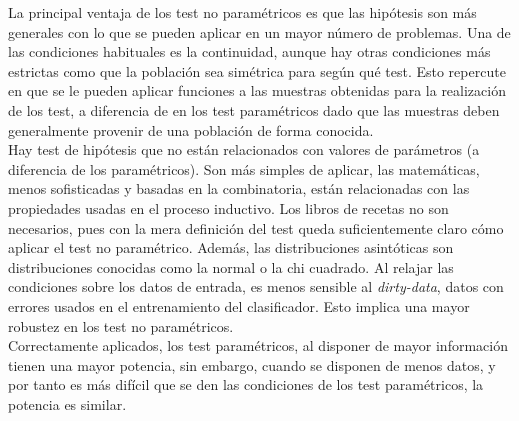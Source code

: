  
 	La principal ventaja de los test no paramétricos es que las hipótesis son más generales con lo que se pueden aplicar en un mayor número de problemas. Una de las condiciones habituales es la continuidad, aunque hay otras condiciones más estrictas como que la población sea simétrica para según qué test. Esto repercute en que se le pueden aplicar funciones a las muestras obtenidas para la realización de los test, a diferencia de en los test paramétricos dado que las muestras deben generalmente provenir de una población de forma conocida.\\
 	
 	Hay test de hipótesis que no están relacionados con valores de parámetros (a diferencia de los paramétricos). Son más simples de aplicar, las matemáticas, menos sofisticadas y basadas en la combinatoria, están relacionadas con las propiedades usadas en el proceso inductivo. Los libros de recetas no son necesarios, pues con la mera definición del test queda suficientemente claro cómo aplicar el test no paramétrico. Además, las distribuciones asintóticas son distribuciones conocidas como la normal o la chi cuadrado. Al relajar las condiciones sobre los datos de entrada, es menos sensible al \textit{dirty-data}, datos con errores usados en el entrenamiento del clasificador. Esto implica una mayor robustez en los test no paramétricos.\\
 	
 	Correctamente aplicados, los test paramétricos, al disponer de mayor información tienen una mayor potencia, sin embargo, cuando se disponen de menos datos, y por tanto es más difícil que se den las condiciones de los test paramétricos, la potencia es similar.